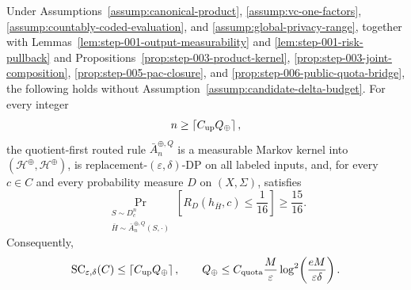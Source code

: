 \begin{proposition}
\label{prop:step-015-global-upper}
Under Assumptions~\ref{assump:canonical-product},
\ref{assump:vc-one-factors},
\ref{assump:countably-coded-evaluation}, and
\ref{assump:global-privacy-range}, together with
Lemmas~\ref{lem:step-001-output-measurability} and
\ref{lem:step-001-risk-pullback} and
Propositions~\ref{prop:step-003-product-kernel},
\ref{prop:step-003-joint-composition},
\ref{prop:step-005-pac-closure}, and
\ref{prop:step-006-public-quota-bridge}, the following holds without
Assumption~\ref{assump:candidate-delta-budget}.  For every integer
\begin{equation}\label{eq:step-015-upper-threshold}
n\ge\left\lceil C_{\rm up}Q_\oplus\right\rceil,
\end{equation}
the quotient-first routed rule \(\bar A_n^{\oplus,Q}\) is a measurable
Markov kernel into \((\mathcal H^\oplus,\mathscr H^\oplus)\), is
replacement-\((\varepsilon,\delta)\)-DP on all labeled inputs, and, for
every \(c\in C\) and every probability measure \(D\) on
\((X,\Sigma)\), satisfies
\begin{equation}\label{eq:step-015-upper-pac}
\Pr_{\substack{S\sim D_c^n\\
                \bar H\sim\bar A_n^{\oplus,Q}(S,\cdot)}}
\left[
R_D(h_{\bar H},c)\le\frac1{16}
\right]
\ge\frac{15}{16}.
\end{equation}
Consequently,
\begin{equation}\label{eq:step-015-upper-consequences}
\operatorname{SC}_{\varepsilon,\delta}(C)
\le\left\lceil C_{\rm up}Q_\oplus\right\rceil,
\qquad
Q_\oplus
\le C_{\rm quota}\frac{M}{\varepsilon}
\log^2\!\left(\frac{eM}{\varepsilon\delta}\right).
\end{equation}
\end{proposition}

